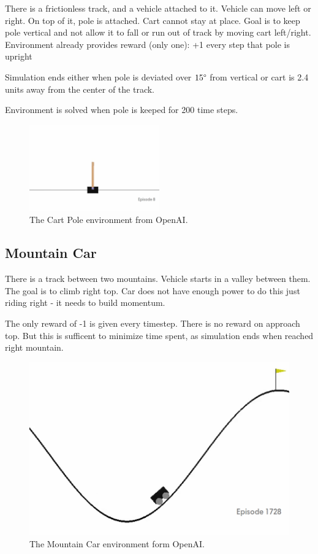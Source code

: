 \documentclass[12pt]{article}
\begin{document}
There is a frictionless track, and a vehicle attached to it. Vehicle can move left or right. On top of it, pole is attached. Cart cannot stay at place. Goal is to keep pole vertical and not allow it to fall or run out of track by moving cart left/right. Environment already provides reward (only one): +1 every step that pole is upright

Simulation ends either when pole is deviated over $15\degree$ from vertical or cart is 2.4 units away from the center of the track.

Environment is solved when pole is keeped for 200 time steps.

\begin{figure}[h]
\includegraphics[width=0.5\textwidth]{cartpole_intro.png} 
\centering
\caption{The Cart Pole environment from OpenAI.}
\end{figure}


\subsection{Mountain Car}
There is a track between two mountains. Vehicle starts in a valley between them. The goal is to climb right top. Car does not have enough power to do this just riding right - it needs to build momentum. 

The only reward of -1 is given every timestep. There is no reward on approach top. But this is sufficent to minimize time spent, as simulation ends when reached right mountain.

\begin{figure}[h]
\includegraphics[width=\textwidth]{mountaincar_intro.png} 
\centering
\caption{The Mountain Car environment form OpenAI.}
\end{figure}
\end{document}
